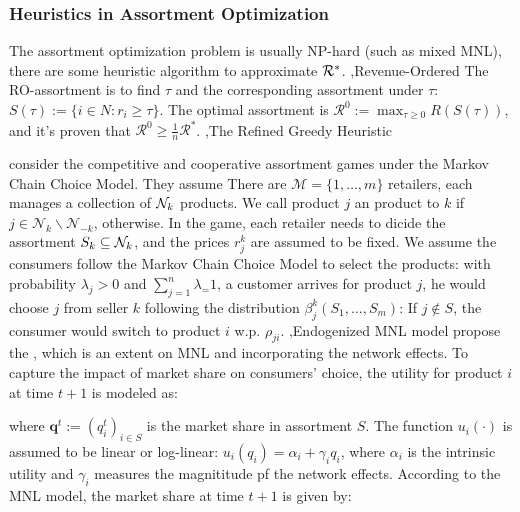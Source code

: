 \documentclass[10pt]{report}
\begin{document}
\subsubsection{Heuristics in Assortment Optimization}
The assortment optimization problem is usually NP-hard (such as mixed MNL), there are some heuristic algorithm to approximate $\mathcal{R}^*$.
\sep{Revenue-Ordered}
The RO-assortment is to find $\tau$ and the corresponding assortment under $\tau$: $S(\tau):=\{i\in N:r_i\geq\tau\}.$ The optimal assortment is 
$\mathcal{R}^0:=\max_{\tau\geq0}R(S(\tau))$, and it's proven that $\mathcal{R}^0\geq\frac1n\mathcal{R}^*$.
\sep{The Refined Greedy Heuristic}

\cite{nipCompetitiveCooperativeAssortment2021} consider the competitive and cooperative assortment games under the Markov Chain Choice Model. They assume There are $\mathcal{M}=\{1,\ldots,m\}$ retailers, each manages a
collection of $\mathcal{N}_k$ products. We call product $j$ an  product to $k$ if $j\in\mathcal{N}_{k}\backslash\mathcal{N}_{-k}$,  otherwise. In the game, each retailer needs to dicide
the assortment $S_k \subseteq \mathcal{N}_k$, and the prices $r_j^k$ are assumed to be fixed. We assume the consumers follow the Markov Chain Choice Model to select the products: with probability $\lambda_j>0$ and $\sum_{j=1}^n \lambda_=1$, a customer
arrives for product $j$, he would choose $j$ from seller $k$ following the distribution $\beta_j^k(S_1,\ldots,S_m)$:
If $j\notin S$, the consumer would switch to product $i$ w.p. $\rho_{ji}$.
\sep{Endogenized MNL model}
\cite{Wang2017} propose the , which is an extent on MNL and incorporating the network effects.
To capture the impact of market share on consumers’ choice, the utility for product $i$ at time $t+1$ is modeled as:


where $\mathbf{q}^t:=(q_i^t)_{i\in S}$ is the market share in assortment $S$. The function $u_i(\cdot)$ is assumed to be linear or log-linear: $u_{i}(q_{i})=\alpha_{i}+\gamma_{i}q_{i}$, where $\alpha_i$ is the intrinsic utility and $\gamma_i$ measures the magnititude pf the network effects. According to the MNL model, the market share at time $t+1$ is given by:
\end{document}
